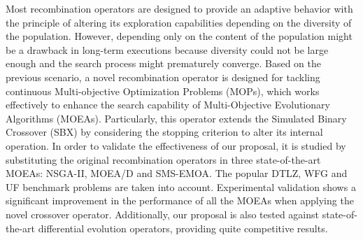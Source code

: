 Most recombination operators are designed to provide an adaptive behavior with the principle of altering its exploration capabilities depending on the diversity of the population.
%
However, depending only on the content of the population might be a drawback in long-term executions because diversity could not be large enough and the search process might prematurely converge.
%
Based on the previous scenario, a novel recombination operator is designed for tackling continuous Multi-objective Optimization Problems (MOPs), which works effectively to enhance the search capability of Multi-Objective Evolutionary Algorithms (MOEAs).
%
Particularly, this operator extends the Simulated Binary Crossover (SBX) by considering the stopping criterion to alter its internal operation.
%
In order to validate the effectiveness of our proposal, it is studied by substituting the original recombination operators in  three state-of-the-art MOEAs: NSGA-II, MOEA/D and SMS-EMOA.
%
The popular DTLZ, WFG and UF benchmark problems are taken into account.
%
Experimental validation shows a significant improvement in the performance of all the MOEAs when applying the novel crossover operator.
%
Additionally, our proposal is also tested against state-of-the-art differential evolution operators, providing quite competitive results.
%
